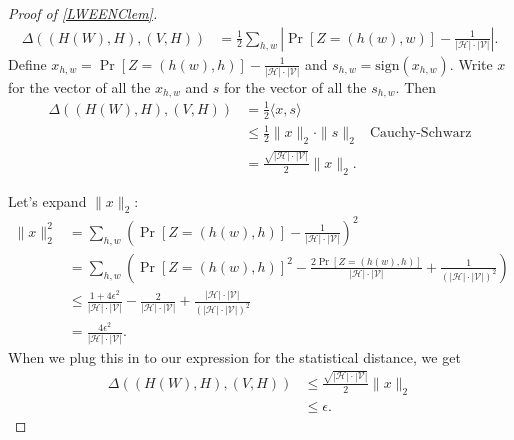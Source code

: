 \begin{proof}[Proof of \cref{LWEENClem}]
\begin{equation*}
\begin{aligned} \Delta((H(W),H),(V,H))&=\frac{1}{2}\sum_{h,w}\left|\Pr[Z=(h(w),w)]-\frac{1}{|\mathcal{H}|\cdot|\mathcal{V}|}\right|.\end{aligned}
\end{equation*}
Define
\(x_{h,w}=\Pr[Z=(h(w),h)]-\frac{1}{|\mathcal{H}|\cdot|\mathcal{V}|}\)
and \(s_{h,w}=\text{sign}(x_{h,w})\). Write \(x\) for the vector of all
the \(x_{h,w}\) and \(s\) for the vector of all the \(s_{h,w}\). Then
\begin{equation*}
\begin{aligned}\Delta((H(W),H),(V,H))&=\frac{1}{2}\langle x,s\rangle\\&\le\frac{1}{2}\|x\|_2\cdot\|s\|_2&\text{Cauchy-Schwarz}\\
&=\frac{\sqrt{|\mathcal{H}|\cdot|\mathcal{V}|}}{2}\|x\|_2.\end{aligned}
\end{equation*}

Let's expand \(\|x\|_2\):
\begin{equation*}
\begin{aligned} \|x\|_2^2&=\sum_{h,w}\left(\Pr[Z=(h(w),h)]-\frac{1}{|\mathcal{H}|\cdot|\mathcal{V}|}\right)^2\\&=\sum_{h,w}\left(\Pr[Z=(h(w),h)]^2-\frac{2\Pr[Z=(h(w),h)]}{|\mathcal{H}|\cdot|\mathcal{V}|}+\frac{1}{(|\mathcal{H}|\cdot|\mathcal{V}|)^2}\right)\\&\le\frac{1+4\epsilon^2}{|\mathcal{H}|\cdot|\mathcal{V}|}-\frac{2}{|\mathcal{H}|\cdot|\mathcal{V}|}+\frac{|\mathcal{H}|\cdot|\mathcal{V}|}{(|\mathcal{H}|\cdot|\mathcal{V}|)^2}\\&=\frac{4\epsilon^2}{|\mathcal{H}|\cdot|\mathcal{V}|}.\end{aligned}
\end{equation*}
When we plug this in to our expression for the statistical distance, we
get
\begin{equation*}
\begin{aligned}\Delta((H(W),H),(V,H))&\le\frac{\sqrt{|\mathcal{H}|\cdot|\mathcal{V}|}}{2}\|x\|_2\\&\le \epsilon.\end{aligned}
\end{equation*}

\end{proof}


